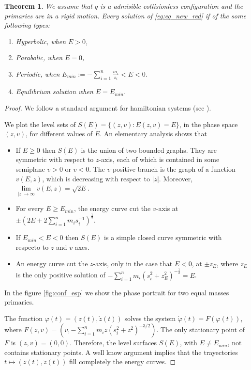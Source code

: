 \documentclass[twoside]{article}
\newtheorem{thm}{Theorem}[section]
\theoremstyle{remark}
\begin{document}
\begin{thm}\label{thm:prin_ine} We assume that $q$ is a admisible collisionless configuration and the primaries are in a rigid motion. Every solution of \eqref{eq:eq_new_red} if of the some following types:
\begin{enumerate}
\item\label{1} Hyperbolic, when $E>0$,
\item\label{2} Parabolic, when $E=0$,
\item\label{3} Periodic, when $E_{min}:=-\sum_{i=1}^{n}\frac{m_i}{s_i}<E<0$.
\item\label{4} Equilibrium solution when $E=E_{min}$.
\end{enumerate}
\end{thm}

\begin{proof}
We follow a standard argument for hamiltonian systems (see \cite{rivera2012bifurcacion}).

We plot the level sets of $S(E)=\{(z,v):E(z,v)=E\}$, in the phase space $(z,v)$,  for different values of $E$. An elementary analysis shows that
\begin{itemize}
 \item If $E\geq 0$ then $S(E)$ is the union of two bounded graphs. They are symmetric with respect to $z$-axis, each of which is contained  in some semiplane $v> 0$ or $v<0$. The $v$-positive branch is the graph of a function $v(E,z)$, which  is decreasing with respect to $|z|$. Moreover, $\lim\limits_{|z|\to \infty}v(E,z)=\sqrt{2E}$.

 \item For every $E\geq E_{min}$, the energy curve cut the $v$-axis at $\pm(2E+2\sum_{i=1}^n m_is_i^{-1})^{\frac12}$.

 \item If $E_{min}<E<0$ then $S(E)$ is a simple closed curve symmetric with respecto to $z$ and $v$ axes.

 \item  An energy curve cut the $z$-axis, only in the case that $E<0$, at $\pm z_{E}$, where $z_E$ is the only positive solution of $-\sum_{i=1}^n m_i (s_i^2+z_{E}^2)^{-\frac12}=E$.
\end{itemize}

In the figure  \ref{fig:conf_esp} we show the phase portrait for two equal masses primaries.

The function $\varphi(t)=(z(t),\dot{z}(t))$ solves the system $\dot{\varphi}(t)=F(\varphi(t))$, where $F(z,v)=(v,-\sum_{i=1}^{n}m_iz (s_i^2+z^2)^{-3/2})$. The only stationary point of $F$ is $(z,v)=(0,0)$. Therefore, the level surfaces $S(E)$, with $E\neq E_{min}$, not contains stationary points. A well know argument implies that the trayectories $t\mapsto (z(t),\dot{z}(t))$  fill completely the energy curves.


\end{proof}
\end{document}
